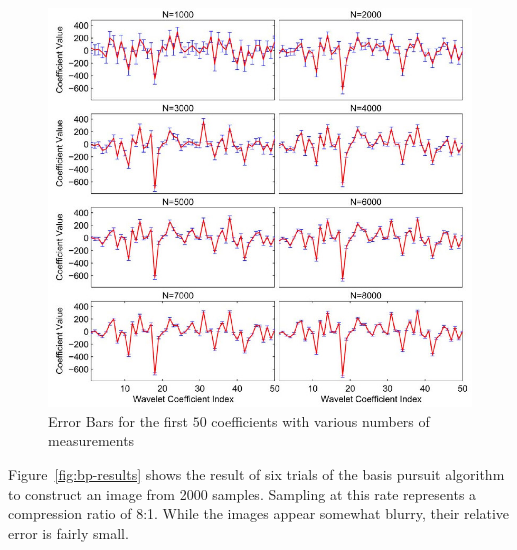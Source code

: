\documentclass{IEEEtran}
\begin{document}
\begin{figure}[ht]
  \centering
  \includegraphics[width=1\linewidth]{he_carin_errorbars}
  \caption{Error Bars for the first $50$ coefficients with various
    numbers of measurements}
  \label{wave4}
\end{figure}

Figure~\ref{fig:bp-results} shows the result of six trials of the basis pursuit algorithm to construct an image from 2000 samples.  Sampling at this rate represents a compression ratio of 8:1. While the images appear somewhat blurry, their relative error is fairly small.
\end{document}
